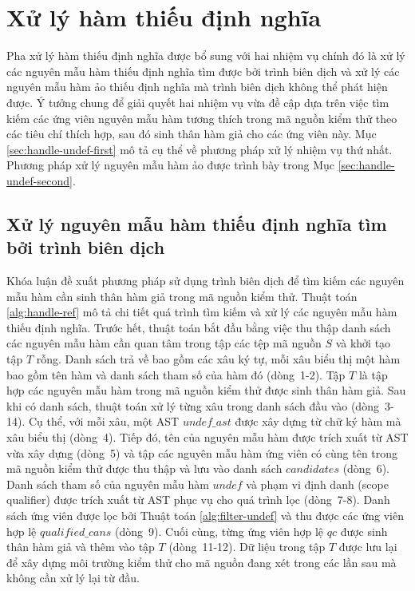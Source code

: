 \section{Xử lý hàm thiếu định nghĩa} \label{sec:handle-undef}
Pha xử lý hàm thiếu định nghĩa được bổ sung với hai nhiệm vụ chính đó là xử lý các nguyên mẫu hàm thiếu định nghĩa tìm được bởi trình biên dịch và xử lý các nguyên mẫu hàm ảo thiếu định nghĩa mà trình biên dịch không thể phát hiện được. Ý tưởng chung để giải quyết hai nhiệm vụ vừa đề cập dựa trên việc tìm kiếm các ứng viên nguyên mẫu hàm tương thích trong mã nguồn kiểm thử theo các tiêu chí thích hợp, sau đó sinh thân hàm giả cho các ứng viên này. Mục \autoref{sec:handle-undef-first} mô tả cụ thể về phương pháp xử lý nhiệm vụ thứ nhất. Phương pháp xử lý nguyên mẫu hàm ảo được trình bày trong Mục \autoref{sec:handle-undef-second}.

\subsection{Xử lý nguyên mẫu hàm thiếu định nghĩa tìm bởi trình biên dịch} \label{sec:handle-undef-first}
Khóa luận đề xuất phương pháp sử dụng trình biên dịch để tìm kiếm các nguyên mẫu hàm cần sinh thân hàm giả trong mã nguồn kiểm thử. Thuật toán \autoref{alg:handle-ref} mô tả chi tiết quá trình tìm kiếm và xử lý các nguyên mẫu hàm thiếu định nghĩa. Trước hết, thuật toán bắt đầu bằng việc thu thập danh sách các nguyên mẫu hàm cần quan tâm trong tập các tệp mã nguồn $S$ và khởi tạo tập $T$ rỗng. Danh sách trả về bao gồm các xâu ký tự, mỗi xâu biểu thị một hàm bao gồm tên hàm và danh sách tham số của hàm đó (dòng~1-2). Tập $T$ là tập hợp các nguyên mẫu hàm trong mã nguồn kiểm thử được sinh thân hàm giả. Sau khi có danh sách, thuật toán xử lý từng xâu trong danh sách đầu vào (dòng~3-14). Cụ thể, với mỗi xâu, một AST $undef\_ast$ được xây dựng từ chữ ký hàm mà xâu biểu thị (dòng~4). Tiếp đó, tên của nguyên mẫu hàm được trích xuất từ AST vừa xây dựng (dòng~5) và tập các nguyên mẫu hàm ứng viên có cùng tên trong mã nguồn kiểm thử được thu thập và lưu vào danh sách $candidates$ (dòng~6). Danh sách tham số của nguyên mẫu hàm $undef$ và phạm vi định danh (scope qualifier) được trích xuất từ AST phục vụ cho quá trình lọc (dòng~7-8). Danh sách ứng viên được lọc bởi Thuật toán \autoref{alg:filter-undef} và thu được các ứng viên hợp lệ $qualified\_cans$ (dòng~9). Cuối cùng, từng ứng viên hợp lệ $qc$ được sinh thân hàm giả và thêm vào tập $T$ (dòng~11-12). Dữ liệu trong tập $T$ được lưu lại để xây dựng môi trường kiểm thử cho mã nguồn đang xét trong các lần sau mà không cần xử lý lại từ đầu.

